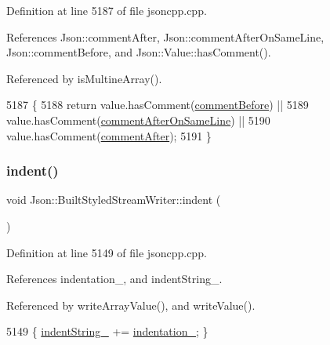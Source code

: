 Definition at line 5187 of file jsoncpp.\+cpp.



References Json\+::comment\+After, Json\+::comment\+After\+On\+Same\+Line, Json\+::comment\+Before, and Json\+::\+Value\+::has\+Comment().



Referenced by is\+Multine\+Array().


\begin{DoxyCode}
5187                                                                    \{
5188   \textcolor{keywordflow}{return} value.hasComment(\hyperlink{namespace_json_a4fc417c23905b2ae9e2c47d197a45351a52f1733775460517b2ea6bedf4906d52}{commentBefore}) ||
5189          value.hasComment(\hyperlink{namespace_json_a4fc417c23905b2ae9e2c47d197a45351a008a230a0586de54f30b76afe70fdcfa}{commentAfterOnSameLine}) ||
5190          value.hasComment(\hyperlink{namespace_json_a4fc417c23905b2ae9e2c47d197a45351ac5784ca53b12250888ddb642b06aebef}{commentAfter});
5191 \}
\end{DoxyCode}
\mbox{\label{struct_json_1_1_built_styled_stream_writer_a73e09692a2cfbd6e67836b060dc34a9f}} 
\subsubsection{\texorpdfstring{indent()}{indent()}}
{\footnotesize\ttfamily void Json\+::\+Built\+Styled\+Stream\+Writer\+::indent (\begin{DoxyParamCaption}{ }\end{DoxyParamCaption})\hspace{0.3cm}{\ttfamily [private]}}



Definition at line 5149 of file jsoncpp.\+cpp.



References indentation\+\_\+, and indent\+String\+\_\+.



Referenced by write\+Array\+Value(), and write\+Value().


\begin{DoxyCode}
5149 \{ \hyperlink{struct_json_1_1_built_styled_stream_writer_a0f8115a4fb474ab0e9de25f10e5ca09a}{indentString\_} += \hyperlink{struct_json_1_1_built_styled_stream_writer_aaa4cbad91428ceca37cbabfc2a17a92d}{indentation\_}; \}
\end{DoxyCode}
\mbox{\label{struct_json_1_1_built_styled_stream_writer_af423fd33b3d580506ea3efc53b05a077}} 
